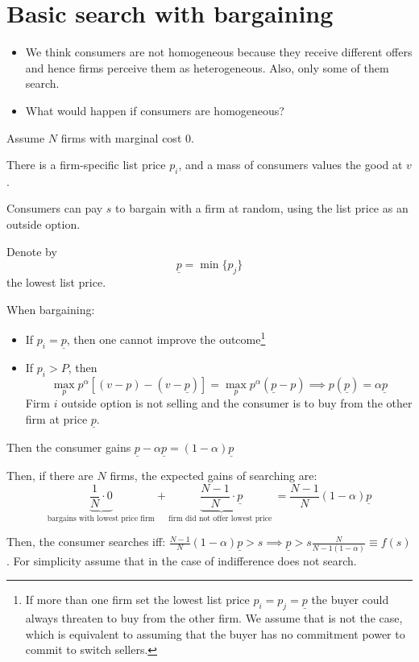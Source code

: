 \documentclass[12pt]{article}
\theoremstyle{plain}
\theoremstyle{plain}
\begin{document}
\section{Basic search with bargaining}\label{sec:basic1}

\begin{itemize}
    \item We think consumers are not homogeneous because they receive different offers and hence firms perceive them as heterogeneous. Also, only some of them search.
    \item What would happen if consumers are homogeneous?
\end{itemize}

Assume $N$ firms with marginal cost $0$.

There is a firm-specific list price $p_i$, and a mass of consumers values the good at $v$.

Consumers can pay $s$ to bargain with a firm at random, using the list price as an outside option.


Denote by
\[
\underline{p} = \min\{p_j\}
\]
the lowest list price.


When bargaining:
\begin{itemize}
    \item If $p_i = \underline{p}$, then one cannot improve the outcome\footnote{If more than one firm set the lowest list price $p_i = p_j = \underline{p}$ the buyer could always threaten to buy from the other firm. We assume that is not the case, which is equivalent to assuming that the buyer has no commitment power to commit to switch sellers.  }
    \item If $p_i > P$, then
    \[
    \max_{p} p^\alpha [(v - p) - (v - \underline{p} )] = \max_{p} p^\alpha (\underline{p}  - p) \implies p(\underline{p} ) = \alpha \underline{p} 
    \]
    Firm $i$ outside option is not selling and the consumer is to buy from the other firm at price $\underline{p} $.
\end{itemize}

Then the consumer gains $\underline{p} - \alpha \underline{p}  = (1-\alpha) \underline{p} $


Then, if there are $N$ firms, the expected gains of searching are:
\[
\underbrace{\frac{1}{N} \cdot 0}_{\text{bargains with lowest price firm}} + \underbrace{\frac{N - 1}{N} \cdot \underline{p}}_{\text{firm did not offer lowest price }} = \frac{N - 1}{N}(1 - \alpha)\underline{p}
\]

Then, the consumer searches iff: $\frac{N - 1}{N}(1 - \alpha)\underline{p}> s \implies \underline{p}> s \frac{N}{N-1(1-\alpha)}\equiv f(s)$. For  simplicity assume that in the case of indifference does not search. 
\end{document}
